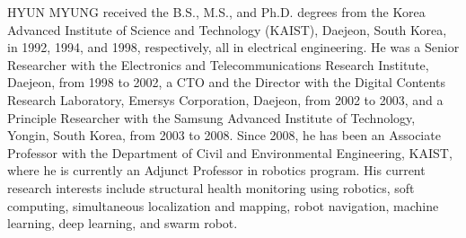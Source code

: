 \documentclass{ieeeaccess}
\begin{document}
\begin{IEEEbiography}{HYUN MYUNG} 
	received the B.S., M.S., and Ph.D. degrees from the Korea Advanced Institute of Science and Technology (KAIST), Daejeon, South Korea, in 1992, 1994, and 1998, respectively, all in electrical engineering. He was a Senior Researcher with the Electronics and Telecommunications Research Institute, Daejeon, from 1998 to 2002, a CTO and the Director with the Digital Contents Research Laboratory, Emersys Corporation, Daejeon, from 2002 to 2003, and a Principle Researcher with the Samsung Advanced Institute of Technology, Yongin, South Korea, from 2003 to 2008. Since 2008, he has been an Associate Professor with the Department of Civil and Environmental Engineering, KAIST, where he is currently an Adjunct Professor in robotics program. His current research interests include structural health monitoring using robotics, soft computing, simultaneous localization and mapping, robot navigation, machine learning, deep learning, and swarm robot.  
\end{IEEEbiography}

\EOD
\end{document}
